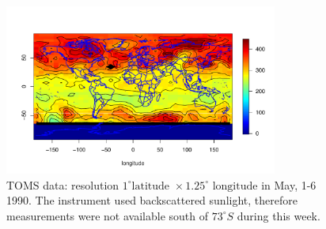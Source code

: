 \vfill


\begin{figure}[H]
\label{TOMS_data}
\centering
\includegraphics [width=0.8\textwidth, keepaspectratio]{graphs/TOMS_data.pdf}
\caption [TOMS data: resolution $1^\circ \mbox{latitude } \times 1.25^\circ \mbox{ longitude}$ in May, 1-6 1990.]{TOMS data: resolution $1^\circ \mbox{latitude } \times 1.25^\circ \mbox{ longitude}$ in May, 1-6 1990. The instrument used backscattered sunlight, therefore measurements were not available south of $73^\circ S$ during this week.}
\end{figure}

